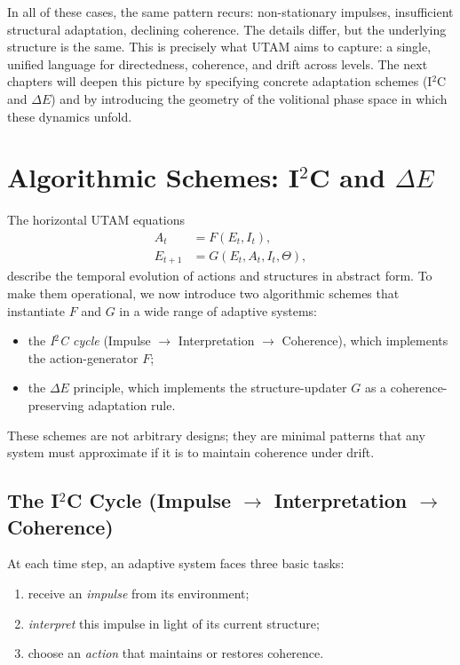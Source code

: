 \documentclass[12pt,a4paper]{report}
\begin{document}
In all of these cases, the same pattern recurs: non-stationary impulses, insufficient structural adaptation, declining coherence. The details differ, but the underlying structure is the same. This is precisely what UTAM aims to capture: a single, unified language for directedness, coherence, and drift across levels. The next chapters will deepen this picture by specifying concrete adaptation schemes (I$^2$C and $\Delta E$) and by introducing the geometry of the volitional phase space in which these dynamics unfold.


\chapter{Algorithmic Schemes: I$^2$C and \texorpdfstring{$\Delta E$}{ΔE}}

The horizontal UTAM equations
\[
\begin{aligned}
    A_t &= F(E_t, I_t), \\
    E_{t+1} &= G(E_t, A_t, I_t, \Theta),
\end{aligned}
\]
describe the temporal evolution of actions and structures in abstract form. To make them operational, we now introduce two algorithmic schemes that instantiate \(F\) and \(G\) in a wide range of adaptive systems:

\begin{itemize}[leftmargin=2em]
    \item the \emph{I$^2$C cycle} (Impulse $\to$ Interpretation $\to$ Coherence), which implements the action-generator \(F\);
    \item the \(\Delta E\) principle, which implements the structure-updater \(G\) as a coherence-preserving adaptation rule.
\end{itemize}

These schemes are not arbitrary designs; they are minimal patterns that any system must approximate if it is to maintain coherence under drift.

\section{The I\texorpdfstring{$^2$}{²}C Cycle (Impulse $\to$ Interpretation $\to$ Coherence)}

At each time step, an adaptive system faces three basic tasks:

\begin{enumerate}[leftmargin=2em]
    \item receive an \emph{impulse} from its environment;
    \item \emph{interpret} this impulse in light of its current structure;
    \item choose an \emph{action} that maintains or restores coherence.
\end{enumerate}
\end{document}
